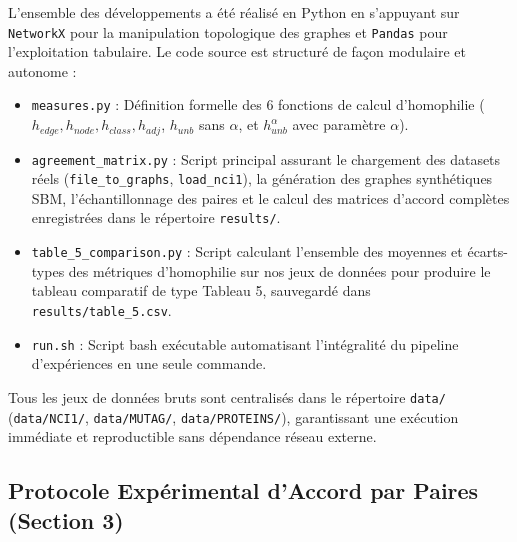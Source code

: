 \documentclass[11pt,a4paper]{article}
\begin{document}
L'ensemble des développements a été réalisé en Python en s'appuyant sur \texttt{NetworkX} pour la manipulation topologique des graphes et \texttt{Pandas} pour l'exploitation tabulaire. Le code source est structuré de façon modulaire et autonome :
\begin{itemize}[leftmargin=1.5em]
    \item \texttt{measures.py} : Définition formelle des 6 fonctions de calcul d'homophilie ($h_{edge}, h_{node}, h_{class}, h_{adj}$, $h_{unb}$ sans $\alpha$, et $h_{unb}^\alpha$ avec paramètre $\alpha$).
    \item \texttt{agreement\_matrix.py} : Script principal assurant le chargement des datasets réels (\texttt{file\_to\_graphs}, \texttt{load\_nci1}), la génération des graphes synthétiques SBM, l'échantillonnage des paires et le calcul des matrices d'accord complètes enregistrées dans le répertoire \texttt{results/}.
    \item \texttt{table\_5\_comparison.py} : Script calculant l'ensemble des moyennes et écarts-types des métriques d'homophilie sur nos jeux de données pour produire le tableau comparatif de type Tableau 5, sauvegardé dans \texttt{results/table\_5.csv}.
    \item \texttt{run.sh} : Script bash exécutable automatisant l'intégralité du pipeline d'expériences en une seule commande.
\end{itemize}

Tous les jeux de données bruts sont centralisés dans le répertoire \texttt{data/} (\texttt{data/NCI1/}, \texttt{data/MUTAG/}, \texttt{data/PROTEINS/}), garantissant une exécution immédiate et reproductible sans dépendance réseau externe.

\subsection{Protocole Expérimental d'Accord par Paires (Section 3)}
\end{document}
